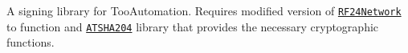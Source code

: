 \href{https://bestpractices.coreinfrastructure.org/projects/1118}{\tt }

A signing library for Too\+Automation. Requires modified version of \href{https://github.com/Avamander/RF24Network}{\tt R\+F24\+Network} to function and \href{https://github.com/Cathedrow/Cryptosuite}{\tt A\+T\+S\+H\+A204} library that provides the necessary cryptographic functions. 
